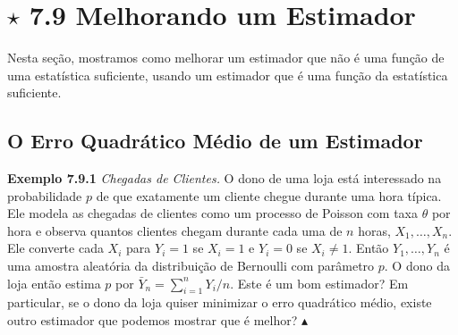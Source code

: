 \section*{$\star$ 7.9 Melhorando um Estimador}

Nesta seção, mostramos como melhorar um estimador que não é uma função de uma estatística suficiente, usando um estimador que é uma função da estatística suficiente.

\subsection*{O Erro Quadrático Médio de um Estimador}

\noindent\textbf{Exemplo 7.9.1} \quad \textit{Chegadas de Clientes.} O dono de uma loja está interessado na probabilidade $p$ de que exatamente um cliente chegue durante uma hora típica. Ele modela as chegadas de clientes como um processo de Poisson com taxa $\theta$ por hora e observa quantos clientes chegam durante cada uma de $n$ horas, $X_1, \dots, X_n$. Ele converte cada $X_i$ para $Y_i = 1$ se $X_i=1$ e $Y_i=0$ se $X_i \neq 1$. Então $Y_1, \dots, Y_n$ é uma amostra aleatória da distribuição de Bernoulli com parâmetro $p$. O dono da loja então estima $p$ por $\bar{Y}_n = \sum_{i=1}^{n} Y_i/n$. Este é um bom estimador? Em particular, se o dono da loja quiser minimizar o erro quadrático médio, existe outro estimador que podemos mostrar que é melhor? \hfill $\blacktriangle$

\vspace{\baselineskip}

